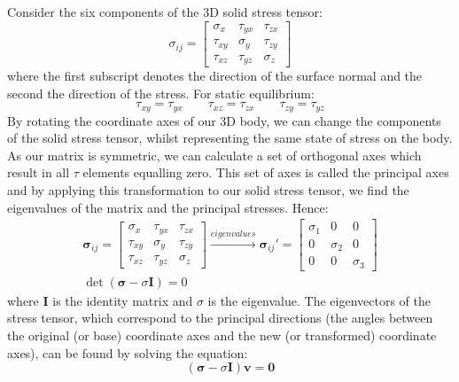 Consider the six components of the 3D solid stress tensor:
\begin{equation}
    \sigma_{ij} = \begin{bmatrix}
        \sigma_x & \tau_{yx} & \tau_{zx}\\
        \tau_{xy} & \sigma_y & \tau_{zy}\\
        \tau_{xz} & \tau_{yz} & \sigma_z
    \end{bmatrix}
\end{equation}
where the first subscript denotes the direction of the surface normal and the second the direction of the stress. For static equilibrium:
\begin{equation}
    \tau_{xy} = \tau_{yx} \qquad \tau_{xz} = \tau_{zx} \qquad \tau_{zy} = \tau_{yz}
\end{equation}
By rotating the coordinate axes of our 3D body, we can change the components of the solid stress tensor, whilst representing the same state of stress on the body. As our matrix is symmetric, we can calculate a set of orthogonal axes which result in all $\tau$ elements equalling zero. This set of axes is called the principal axes and by applying this transformation to our solid stress tensor, we find the eigenvalues of the matrix and the principal stresses. Hence:
\begin{gather}
    \boldsymbol{\sigma}_{ij} = \begin{bmatrix}
        \sigma_x & \tau_{yx} & \tau_{zx}\\
        \tau_{xy} & \sigma_y & \tau_{zy}\\
        \tau_{xz} & \tau_{yz} & \sigma_z
    \end{bmatrix} \xrightarrow{eigenvalues} \boldsymbol{\sigma}_{ij}' = \begin{bmatrix}
        \sigma_1 & 0 & 0\\
        0 & \sigma_2 & 0\\
        0 & 0 & \sigma_3
    \end{bmatrix}\\
    \det(\boldsymbol{\sigma} - \sigma \boldsymbol{I}) = 0
\end{gather}
where $\boldsymbol{I}$ is the identity matrix and $\sigma$ is the eigenvalue. The eigenvectors of the stress tensor, which correspond to the principal directions (the angles between the original (or base) coordinate axes and the new (or transformed) coordinate axes), can be found by solving the equation:
\begin{equation}
    (\boldsymbol{\sigma} - \sigma \boldsymbol{I})\boldsymbol{v} = \boldsymbol{0}
\end{equation}
